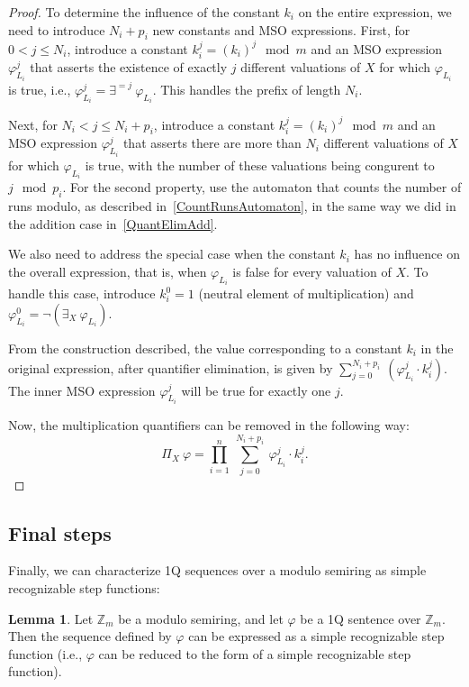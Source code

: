 \documentclass[12pt]{article}
\theoremstyle{definition}
\newtheorem{lemma}[theorem]{Lemma}
\begin{document}
\begin{proof}
    To determine the influence of the constant $k_i$ on the entire expression, we need to introduce $N_i + p_i$ new constants and MSO expressions. First, for $0 < j \leq N_i$, introduce a constant $k_i^j = (k_i)^j \mod m$ and an MSO expression $\varphi_{L_i}^j$ that asserts the existence of exactly $j$ different valuations of $X$ for which $\varphi_{L_i}$ is true, i.e., $\varphi_{L_i}^j = \exists^{=j} \ \varphi_{L_i}$. This handles the prefix of length $N_i$.
    
    Next, for $N_i < j \leq N_i + p_i$, introduce a constant $k_i^j = (k_i)^j \mod m$ and an MSO expression $\varphi_{L_i}^j$ that asserts there are more than $N_i$ different valuations of $X$ for which $\varphi_{L_i}$ is true, with the number of these valuations being congurent to $j \mod p_i$. For the second property, use the automaton that counts the number of runs modulo, as described in~\cref{CountRunsAutomaton}, in the same way we did in the addition case in~\cref{QuantElimAdd}.

    We also need to address the special case when the constant $k_i$ has no influence on the overall expression, that is, when $\varphi_{L_i}$ is false for every valuation of $X$. To handle this case, introduce $k_i^0 = 1$ (neutral element of multiplication) and $\varphi_{L_i}^0 = \neg(\exists_X \ \varphi_{L_i})$.

    From the construction described, the value corresponding to a constant $k_i$ in the original expression, after quantifier elimination, is given by $\sum_{j = 0}^{N_i + p_i} \ (\varphi_{L_i}^j \cdot k_i^j)$. The inner MSO expression $\varphi_{L_i}^j$ will be true for exactly one $j$.
    
    Now, the multiplication quantifiers can be removed in the following way:
    $$\Pi_X \ \varphi = \prod_{i = 1}^n \ \sum_{j = 0}^{N_i + p_i} \ \varphi_{L_i}^j \cdot k_i^j.$$
\end{proof}

\subsection{Final steps}
Finally, we can characterize 1Q sequences over a modulo semiring as simple recognizable step functions:

\begin{lemma}
    \label{OverModAreSimpleRec}
    Let $\mathbb{Z}_m$ be a modulo semiring, and let $\varphi$ be a 1Q sentence over $\mathbb{Z}_m$. Then the sequence defined by $\varphi$ can be expressed as a simple recognizable step function (i.e., $\varphi$ can be reduced to the form of a simple recognizable step function). 
\end{lemma}
\end{document}
